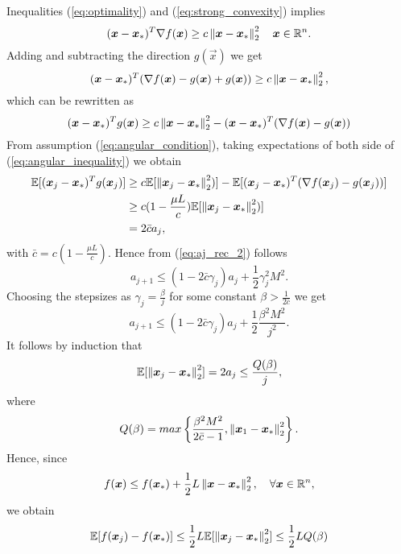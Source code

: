 Inequalities (\ref{eq:optimality}) and (\ref{eq:strong_convexity}) implies
\begin{equation}
(\boldsymbol{x}-\boldsymbol{x}_*)^T \nabla f(\boldsymbol{x}) \geq c \left\Vert \boldsymbol{x}-\boldsymbol{x}_* \right\Vert^2_2 \quad \boldsymbol{x} \in \mathbb{R}^n.
\end{equation}
Adding and subtracting the direction $g(\vec{x})$ we get
\begin{equation}
(\boldsymbol{x}-\boldsymbol{x}_*)^T (\nabla f(\boldsymbol{x}) -g(\boldsymbol{x}) +g(\boldsymbol{x})) \geq c \left\Vert \boldsymbol{x}-\boldsymbol{x}_* \right\Vert^2_2,
\label{eq:begin_modification}
\end{equation}
which can be rewritten as
\begin{equation}
(\boldsymbol{x}-\boldsymbol{x}_*)^T g(\boldsymbol{x}) \geq c \left\Vert \boldsymbol{x}-\boldsymbol{x}_* \right\Vert^2_2 - (\boldsymbol{x}-\boldsymbol{x}_*)^T (\nabla f(\boldsymbol{x}) -g(\boldsymbol{x}))
\label{eq:angular_inequality}
\end{equation}
From assumption (\ref{eq:angular_condition}), taking expectations of both side of (\ref{eq:angular_inequality}) we obtain
\begin{align}
\mathbb{E}[(\boldsymbol{x}_j-\boldsymbol{x}_*)^T g(\boldsymbol{x}_j)] &\geq c \mathbb{E}[\left\Vert \boldsymbol{x}_j-\boldsymbol{x}_* \right\Vert^2_2)] - \mathbb{E}[(\boldsymbol{x}_j-\boldsymbol{x}_*)^T (\nabla f(\boldsymbol{x}_j) -g(\boldsymbol{x}_j))]\\
&\geq c(1-\frac{\mu L}{c}) \mathbb{E}[\left\Vert \boldsymbol{x}_j-\boldsymbol{x}_* \right\Vert^2_2)]\\
& = 2\bar{c}a_j,
\end{align}
with $\bar{c}=c(1-\frac{\mu L}{c})$.
Hence from (\ref{eq:aj_rec_2}) follows 
\begin{equation}
a_{j+1} \leq (1-2\bar{c}\gamma_j)a_j + \frac{1}{2}\gamma_j^2M^2.
\end{equation}
Choosing the stepsizes as $\gamma_j = \frac{\beta}{j}$ for some constant $\beta>\frac{1}{2\bar{c}}$ we get
\begin{equation}
a_{j+1} \leq (1-2\bar{c}\gamma_j)a_j + \frac{1}{2}\frac{\beta^2M^2}{j^2}.
\label{eq:end_modification}
\end{equation}
It follows by induction that
\begin{equation}
\mathbb{E}[\left\Vert \boldsymbol{x}_j - \boldsymbol{x}_* \right\Vert^2_2] = 2a_j\leq \frac{Q(\beta)}{j},
\end{equation}
where 
\begin{equation}
Q(\beta) = max\left\{\frac{\beta^2M^2}{2\bar{c}-1},\left\Vert \boldsymbol{x}_1 - \boldsymbol{x}_* \right\Vert^2_2 \right\}.
\end{equation}
Hence, since
\begin{equation}
f(\boldsymbol{x})\leq f(\boldsymbol{x}_*) + \frac{1}{2}L\left\Vert \boldsymbol{x} - \boldsymbol{x}_* \right\Vert^2_2, \quad \forall \boldsymbol{x} \in \mathbb{R}^n,
\end{equation}
we obtain
\begin{equation}
\mathbb{E}[f(\boldsymbol{x}_j)-f(\boldsymbol{x}_*)] \leq \frac{1}{2} L \mathbb{E}[\left\Vert \boldsymbol{x}_j - \boldsymbol{x}_* \right\Vert^2_2] \leq \frac{1}{2}LQ(\beta)
\end{equation}

